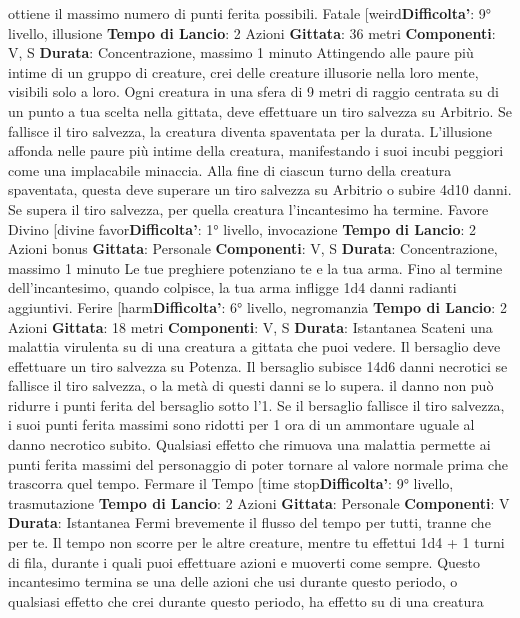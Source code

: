 \begin{multicols}{2}
ottiene il massimo numero di punti ferita possibili.
Fatale
[weird\textbf{Difficolta'}:
9° livello, illusione
\textbf{Tempo di Lancio}: 2 Azioni
\textbf{Gittata}: 36 metri
\textbf{Componenti}: V, S
\textbf{Durata}: Concentrazione, massimo 1 minuto
Attingendo alle paure più intime di un gruppo di
creature, crei delle creature illusorie nella loro mente,
visibili solo a loro. Ogni creatura in una sfera di 9 metri
di raggio centrata su di un punto a tua scelta nella
gittata, deve effettuare un tiro salvezza su Arbitrio.
Se fallisce il tiro salvezza, la creatura diventa
spaventata per la durata. L’illusione affonda nelle paure
più intime della creatura, manifestando i suoi incubi
peggiori come una implacabile minaccia. Alla fine di
ciascun turno della creatura spaventata, questa deve
superare un tiro salvezza su Arbitrio o subire 4d10
danni. Se supera il tiro salvezza, per quella
creatura l’incantesimo ha termine.
Favore Divino
[divine favor\textbf{Difficolta'}:
1° livello, invocazione
\textbf{Tempo di Lancio}: 2 Azioni bonus
\textbf{Gittata}: Personale
\textbf{Componenti}: V, S
\textbf{Durata}: Concentrazione, massimo 1 minuto
Le tue preghiere potenziano te e la tua arma. Fino al
termine dell’incantesimo, quando colpisce, la tua arma
infligge 1d4 danni radianti aggiuntivi.
Ferire
[harm\textbf{Difficolta'}:
6° livello, negromanzia
\textbf{Tempo di Lancio}: 2 Azioni
\textbf{Gittata}: 18 metri
\textbf{Componenti}: V, S
\textbf{Durata}: Istantanea
Scateni una malattia virulenta su di una creatura a
gittata che puoi vedere. Il bersaglio deve effettuare un
tiro salvezza su Potenza. Il bersaglio subisce 14d6
danni necrotici se fallisce il tiro salvezza, o la metà di
questi danni se lo supera. il danno non può ridurre i
punti ferita del bersaglio sotto l’1. Se il bersaglio fallisce
il tiro salvezza, i suoi punti ferita massimi sono ridotti
per 1 ora di un ammontare uguale al danno necrotico
subito. Qualsiasi effetto che rimuova una malattia
permette ai punti ferita massimi del personaggio di
poter tornare al valore normale prima che trascorra quel
tempo.
Fermare il Tempo
[time stop\textbf{Difficolta'}:
9° livello, trasmutazione
\textbf{Tempo di Lancio}: 2 Azioni
\textbf{Gittata}: Personale
\textbf{Componenti}: V
\textbf{Durata}: Istantanea
Fermi brevemente il flusso del tempo per tutti, tranne
che per te. Il tempo non scorre per le altre creature, 
mentre tu effettui 1d4 + 1 turni di fila, durante i quali
puoi effettuare azioni e muoverti come sempre.
Questo incantesimo termina se una delle azioni che usi
durante questo periodo, o qualsiasi effetto che crei
durante questo periodo, ha effetto su di una creatura

\end{multicols}

